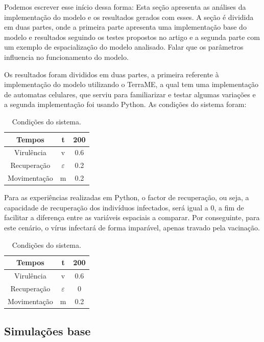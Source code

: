 \documentclass[a4paper,12pt]{article}
\begin{document}
Podemos escrever esse início dessa forma: Esta seção apresenta as análises da implementação do modelo e os resultados gerados com esses. A seção é dividida em duas partes, onde a primeira parte apresenta uma implementação base do modelo e resultados seguindo os testes propostos no artigo e a segunda parte com um exemplo de espacialização do modelo analisado. Falar que os parâmetros influencia no funcionamento do modelo.

Os resultados foram divididos em duas partes, a primeira referente à implementação do modelo utilizando o TerraME, a qual tem uma implementação de automatas celulares, que serviu para familiarizar e testar algumas variações e a segunda implementação foi usando Python. As condições do sistema foram:

\begin{table}[ht]
 \caption{Condições do sistema.}
 \centering
 \begin{tabular}{c|c|c}
 Tempos & t & 200 \\
 \hline
 Virulência & v & 0.6 \\
 Recuperação & $\varepsilon$ & 0.2 \\
 Movimentação & m & 0.2
 \end{tabular}
 \label{tab:condicoes1}
\end{table}

Para as experiências realizadas em Python, o factor de recuperação, ou seja, a capacidade de recuperação dos indivíduos infectados, será igual a 0, a fim de facilitar a diferença entre as variáveis espaciais a comparar.
Por conseguinte, para este cenário, o vírus infectará de forma imparável, apenas travado pela vacinação.

\begin{table}[ht]
 \caption{Condições do sistema.}
 \centering
 \begin{tabular}{c|c|c}
 Tempos & t & 200 \\
 \hline
 Virulência & v & 0.6 \\
 Recuperação & $\varepsilon$ & 0 \\
 Movimentação & m & 0.2
 \end{tabular}
 \label{tab:condicoes2}
\end{table}


\subsection{Simulações base}
\end{document}
